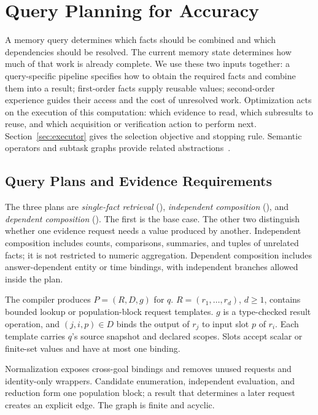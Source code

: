 \section{Query Planning for Accuracy}
\label{sec:framework}

A memory query determines which facts should be combined and which
dependencies should be resolved. The current memory state determines
how much of that work is already complete. We use these two inputs
together: a query-specific pipeline specifies how to obtain the required
facts and combine them into a result;
first-order facts supply reusable values; second-order experience guides
their access and the cost of unresolved work. Optimization acts on the
execution of this computation: which evidence to read, which subresults
to reuse, and which acquisition or verification action to perform next.
Section~\ref{sec:executor} gives the selection objective and stopping rule.
Semantic operators and subtask graphs provide related
abstractions~\cite{lotus,docetl,decomposed,lmcompiler}.

\subsection{Query Plans and Evidence Requirements}
\label{subsec:new-plans}

The three plans are \emph{single-fact retrieval} (\ret),
\emph{independent composition} (\red), and
\emph{dependent composition} (\comp).
The first is the base case. The other two distinguish whether one
evidence request needs a value produced by another.
Independent composition includes counts, comparisons, summaries, and
tuples of unrelated facts; it is not restricted to numeric aggregation.
Dependent composition includes answer-dependent entity or time bindings,
with independent branches allowed inside the plan.

The compiler produces $P=(R,D,g)$ for $q$.
$R=(r_1,\ldots,r_d)$, $d\geq1$, contains bounded lookup or population-block
request templates. $g$ is a type-checked result operation, and
$(j,i,p)\in D$ binds the output of $r_j$ to input slot $p$ of $r_i$.
Each template carries $q$'s source snapshot and declared scopes.
Slots accept scalar or finite-set values and have at most one binding.

Normalization exposes cross-goal bindings and removes unused requests
and identity-only wrappers. Candidate enumeration, independent evaluation, and reduction
form one population block; a result that determines a later request
creates an explicit edge. The graph is finite and acyclic.


